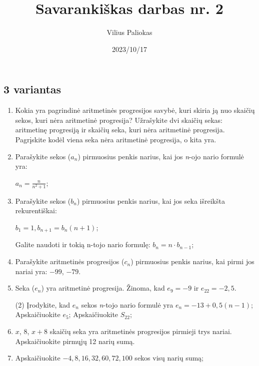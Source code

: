\documentclass[a4paper]{article}
\title{Savarankiškas darbas nr. 2}
\author{Vilius Paliokas}
\date{2023/10/17}
\begin{document}
\thispagestyle{fancy}

\subsection*{3 variantas}

\begin{enumerate}
      \item Kokia yra pagrindinė aritmetinės progresijos savybė, kuri skiria ją
            nuo skaičių sekos, kuri nėra aritmetinė progresija? Užrašykite dvi
            skaičių sekas: aritmetinę progresiją ir skaičių seka, kuri nėra
            aritmetinė progresija. Pagrįskite kodėl viena seka nėra
            aritmetinė progresija, o kita yra.

      \item Parašykite sekos ($a_{n}$) pirmuosius penkis
            narius, kai jos \textit{n}-ojo nario formulė yra:

            $a_{n}=\frac{n}{n^{2} + 1}$;

      \item Parašykite sekos ($b_{n}$) pirmuosius penkis
            narius, kai jos seka išreikšta rekurentiškai:

            $b_1 = 1, b_{n+1}=b_{n}(n+1)$;

            Galite naudoti ir tokią n-tojo nario formulę: $b_{n}=n \cdot
                  b_{n-1}$;

      \item Parašykite aritmetinės progresijos ($c_{n}$) pirmuosius penkis
            narius, kai pirmi jos nariai yra: $-99$, $-79$.

      \item Seka ($e_{n}$) yra aritmetinė progresija. Žinoma, kad $e_{9}=-9$ ir
            $e_{22}=-2,5$.

            \begin{tasks}[item-format={\normalfont}, after-item-skip=2mm](2)
                  \task* Įrodykite, kad $e_{n}$ sekos \textit{n}-tojo nario
                  formulė yra $e_{n}=-13+0,5(n-1)$;
                  \task Apskaičiuokite $e_{5}$;
                  \task Apskaičiuokite $S_{22}$;
            \end{tasks}

      \item $ x $, $ 8 $, $ x + 8$ skaičių seka yra aritmetinės progresijos
            pirmieji trys nariai. Apskaičiuokite pirmųjų 12 narių sumą.

      \item Apskaičiuokite $ -4, 8, 16, 32, 60, 72, 100 $ sekos visų narių sumą;


\end{enumerate}
\end{document}
